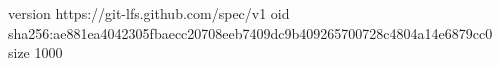 version https://git-lfs.github.com/spec/v1
oid sha256:ae881ea4042305fbaecc20708eeb7409dc9b409265700728c4804a14e6879cc0
size 1000
